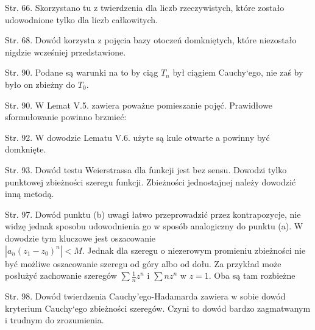 \documentclass[a4paper,11pt]{article}
\begin{document}
\start Str. 66. Skorzystano tu z twierdzenia dla liczb rzeczywistych,
które zostało udowodnione tylko dla liczb całkowitych.

\start Str. 68. Dowód korzysta z pojęcia bazy otoczeń domkniętych,
które niezostało nigdzie wcześniej przedstawione.

\start Str. 90. Podane są warunki na to by ciąg $T_{ n }$ był ciągiem
Cauchy`ego, nie zaś by było on zbieżny do $T_{ 0 }$.

\start Str. 90. W Lemat V.5. zawiera poważne pomieszanie pojęć.
Prawidłowe sformułowanie powinno brzmieć:

\start Str. 92. W dowodzie Lematu V.6. użyte są kule otwarte a powinny
być domknięte.

\start Str. 93. Dowód testu Weierstrassa dla funkcji jest bez sensu.
Dowodzi tylko punktowej zbieżności szeregu funkcji. Zbieżności
jednostajnej należy dowodzić inną metodą.

\start Str. 97. Dowód punktu (b) uwagi łatwo przeprowadzić przez
kontrapozycje, nie widzę jednak sposobu udowodnienia go w sposób
analogiczny do punktu (a). W dowodzie tym kluczowe jest oszacowanie
\\
$| a_{n} (z_{1} - z_{ 0 })^{n}|<M$. Jednak dla szeregu o niezerowym promieniu
zbieżności nie być możliwe oszacowanie szeregu od góry albo od dołu.
Za przykład może posłużyć zachowanie szeregów $\sum \frac{1}{n} z^{n}$ i
$\sum n z^{n}$ w $z=1$. Oba są tam rozbieżne

\start Str. 98. Dowód twierdzenia Cauchy'ego-Hadamarda zawiera w sobie
dowód kryterium Cauchy`ego zbieżności szeregów. Czyni to dowód bardzo
zagmatwanym i trudnym do zrozumienia.


\end{document}
